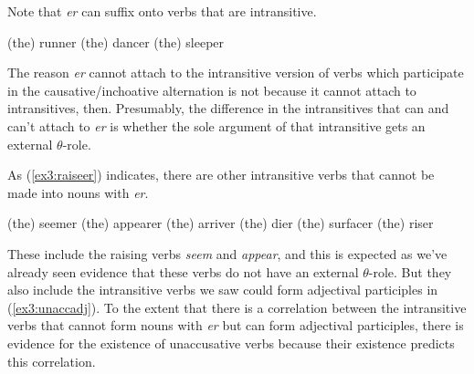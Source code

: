 Note that \textit{er} can suffix onto verbs that are intransitive.
\begin{exe}
\raggedright
	\ex \label{ex3:erunerg}
	\begin{xlist}
		\ex (the) runner
		\ex (the) dancer
		\ex (the) sleeper
	\end{xlist}
\end{exe}
The reason \textit{er} cannot attach to the intransitive version of verbs which participate in the causative/inchoative alternation is not because it cannot attach to intransitives, then. Presumably, the difference in the intransitives that can and can't attach to \textit{er} is whether the sole argument of that intransitive gets an external $\theta$-role. 

As (\ref{ex3:raiseer}) indicates, there are other intransitive verbs that cannot be made into nouns with \textit{er}.
\begin{exe}
\raggedright
	\ex \label{ex3:raiseer}
	\begin{xlist}
		\ex * (the) seemer
		\ex * (the) appearer
		\ex * (the) arriver
		\ex * (the) dier
		\ex * (the) surfacer
		\ex * (the) riser
	\end{xlist}
\end{exe}
These include the raising verbs \textit{seem} and \textit{appear}, and this is expected as we've already seen evidence that these verbs do not have an external $\theta$-role. But they also include the intransitive verbs we saw could form adjectival participles in (\ref{ex3:unaccadj}). To the extent that there is a correlation between the intransitive verbs that cannot form nouns with \textit{er} but can form adjectival participles, there is evidence for the existence of unaccusative verbs because their existence predicts this correlation. 

